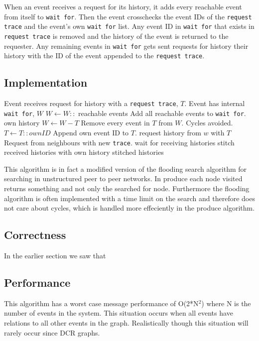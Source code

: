 	When an event receives a request for its history, it adds every reachable event from itself to \texttt{wait for}. Then the event crosschecks the event IDs of the \texttt{request trace} and the event's own \texttt{wait for} list. Any event ID in \texttt{wait for} that exists in \texttt{request trace} is removed and the history of the event is returned to the requester. Any remaining events in \texttt{wait for} gets sent requests for history their history with the ID of the event appended to the \texttt{request trace}. 
	
	\subsection*{Implementation}
	\begin{algorithmic}
		\State Event receives request for history with a \texttt{request trace}, $T$.
		\State Event has internal \texttt{wait for}, $W$
		\State
		\State $W\gets W::$ reachable events \Comment Add all reachable events to \texttt{wait for}.
			\Return own history
		\Else
			\State $W\gets W-T$ \Comment Remove every event in $T$ from $W$. Cycles avoided.
			\State $T\gets T::ownID$ \Comment Append own event ID to $T$.
			\State
				\State request history from $w$ with $T$ \Comment Request from neighbours with new \texttt{trace}.
			\EndFor
			\State wait for receiving histories
			\State stitch received histories with own history
			\State
			\Return stitched histories
		\EndIf
	\end{algorithmic}
	
	\newpar This algorithm is in fact a modified version of the flooding search algorithm for searching in unstructured peer to peer networks. In produce each node visited returns something and not only the searched for node. Furthermore the flooding algorithm is often implemented with a time limit on the search and therefore does not care about cycles, which is handled more effeciently in the produce algorithm.
	
	\subsection*{Correctness}
	In the earlier section we saw that 
	
	\subsection{Performance}
	This algorithm has a worst case message performance of O(2*N$^2$) where N is the number of events in the system. This situation occurs when all events have relations to all other events in the graph. Realistically though this situation will rarely occur since DCR graphs.
	
